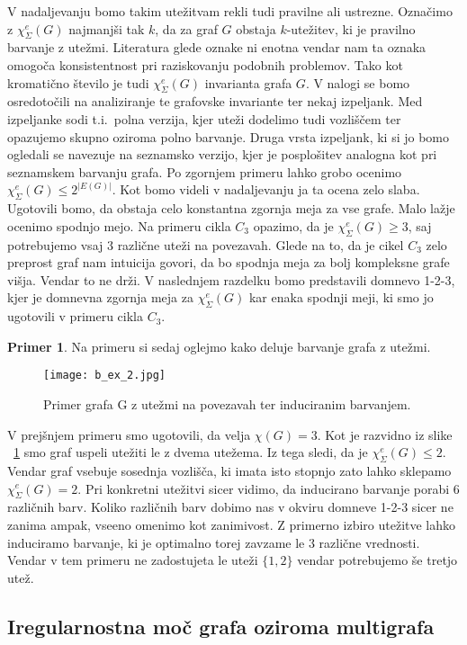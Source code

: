 \documentclass[12pt,a4paper,twoside]{article}
\theoremstyle{definition} %
\newtheorem{primer}[definicija]{Primer}
\theoremstyle{plain} %
\newcommand{\ec}{\chi_{\Sigma}^e}
\numberwithin{equation}{section}  %
\begin{document}
V nadaljevanju bomo takim utežitvam rekli tudi pravilne ali ustrezne. Označimo z $\ec(G)$ najmanjši tak $k$, da za graf $G$ obstaja $k$-utežitev, ki je pravilno barvanje z utežmi. Literatura glede oznake ni enotna vendar nam ta oznaka omogoča konsistentnost pri raziskovanju podobnih problemov. Tako kot kromatično število je tudi $\ec(G)$ invarianta grafa $G$. V nalogi se bomo osredotočili na analiziranje te grafovske invariante ter nekaj izpeljank. Med izpeljanke sodi t.i.\ polna verzija, kjer uteži dodelimo tudi vozliščem ter opazujemo skupno oziroma polno barvanje. Druga vrsta izpeljank, ki si jo bomo ogledali se navezuje na seznamsko verzijo, kjer je posplošitev analogna kot pri seznamskem barvanju grafa. Po zgornjem primeru lahko grobo ocenimo $\ec(G) \le 2^{|E(G)|}$. Kot bomo videli v nadaljevanju ja ta ocena zelo slaba. Ugotovili bomo, da obstaja celo konstantna zgornja meja za vse grafe. Malo lažje ocenimo spodnjo mejo. Na primeru cikla $C_3$ opazimo, da je $\ec(G) \ge 3$, saj potrebujemo vsaj 3 različne uteži na povezavah. Glede na to, da je cikel $C_3$ zelo preprost graf nam intuicija govori, da bo spodnja meja za bolj kompleksne grafe višja. Vendar to ne drži. V naslednjem razdelku bomo predstavili domnevo 1-2-3, kjer je domnevna zgornja meja za $\ec(G)$ kar enaka spodnji meji, ki smo jo ugotovili v primeru cikla $C_3$.

\begin{primer}
Na primeru si sedaj oglejmo kako deluje barvanje grafa z utežmi.
 \begin{figure}[h!]
\caption{Primer grafa G z utežmi na povezavah ter induciranim barvanjem.}
\label{basic_ex1}
\centering
    \texttt{[image: b\_ex\_2.jpg]}
    \end{figure}
V prejšnjem primeru smo ugotovili, da velja $\chi(G) = 3$. Kot je razvidno iz slike ~\ref{basic_ex1} smo graf uspeli utežiti le z dvema utežema. Iz tega sledi, da je $\ec(G) \le 2$. Vendar graf vsebuje sosednja vozlišča, ki imata isto stopnjo zato lahko sklepamo $\ec(G) = 2$. Pri konkretni utežitvi sicer vidimo, da inducirano barvanje porabi $6$ različnih barv. Koliko različnih barv dobimo nas v okviru domneve 1-2-3 sicer ne zanima ampak, vseeno omenimo kot zanimivost. Z primerno izbiro utežitve lahko induciramo barvanje, ki je optimalno torej zavzame le $3$ različne vrednosti. Vendar v tem primeru ne zadostujeta le uteži $\{1,2\}$ vendar potrebujemo še tretjo utež.
\end{primer}

\subsection{Iregularnostna moč grafa oziroma multigrafa}
\end{document}
